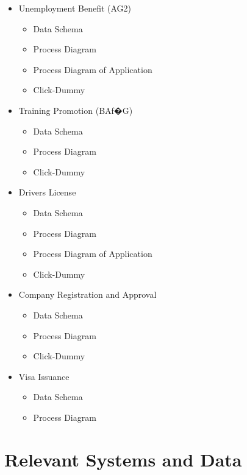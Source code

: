 \documentclass[
     12pt,         %
     a4paper,      %
     BCOR10mm,     %
     DIV14,        %
aragraph skip instad of paragraph indent
     ]{scrreprt}
\begin{document}
\begin{itemize}
     \item Unemployment Benefit (AG2)
\begin{itemize}
     \item Data Schema
     \item Process Diagram
     \item Process Diagram of Application
     \item Click-Dummy
\end{itemize}

\item Training Promotion (BAf�G)
\begin{itemize}
     \item Data Schema
     \item Process Diagram
     \item Click-Dummy
\end{itemize}

\item Drivers License
\begin{itemize}
     \item Data Schema
     \item Process Diagram
     \item Process Diagram of Application
     \item Click-Dummy
\end{itemize}

\item Company Registration and Approval
\begin{itemize}
     \item Data Schema
     \item Process Diagram
     \item Click-Dummy
\end{itemize}

\item Visa Issuance
\begin{itemize}
     \item Data Schema
     \item Process Diagram
\end{itemize}


\end{itemize}


\section{Relevant Systems and Data}

\end{document}
